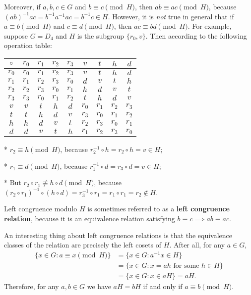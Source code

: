 \documentclass[leqno]{book}
\begin{document}
Moreover, if $a,b,c\in G$ and $b\equiv c\pmod H$, then $ab\equiv ac\pmod H$, because $(ab)^{-1}ac=b^{-1}a^{-1}ac=b^{-1}c\in H$.  However, it is \emph{not} true in general that if $a\equiv b\pmod H$ and $c\equiv d\pmod H$, then $ac\equiv bd\pmod H$.  For example, suppose $G=D_4$ and $H$ is the subgroup $\{r_0,v\}$.  Then according to the following operation table:
\begin{center}
\begin{tabular}{c|cccccccc}
$\circ$ & $r_0$ & $r_1$ & $r_2$ & $r_3$ & $v$ & $t$ & $h$ & $d$\\\hline
$r_0$ & $r_0$ & $r_1$ & $r_2$ & $r_3$ & $v$ & $t$ & $h$ & $d$\\
$r_1$ & $r_1$ & $r_2$ & $r_3$ & $r_0$ & $d$ & $v$ & $t$ & $h$\\
$r_2$ & $r_2$ & $r_3$ & $r_0$ & $r_1$ & $h$ & $d$ & $v$ & $t$\\
$r_3$ & $r_3$ & $r_0$ & $r_1$ & $r_2$ & $t$ & $h$ & $d$ & $v$\\
$v$ & $v$ & $t$ & $h$ & $d$ & $r_0$ & $r_1$ & $r_2$ & $r_3$\\
$t$ & $t$ & $h$ & $d$ & $v$ & $r_3$ & $r_0$ & $r_1$ & $r_2$\\
$h$ & $h$ & $d$ & $v$ & $t$ & $r_2$ & $r_3$ & $r_0$ & $r_1$\\
$d$ & $d$ & $v$ & $t$ & $h$ & $r_1$ & $r_2$ & $r_3$ & $r_0$
\end{tabular}
\end{center}

* $r_2\equiv h\pmod H$, because $r_2^{-1}\circ h=r_2\circ h=v\in H$;

* $r_1\equiv d\pmod H$, because $r_1^{-1}\circ d=r_3\circ d=v\in H$;

* But $r_2\circ r_1\not\equiv h\circ d\pmod H$, because $(r_2\circ r_1)^{-1}\circ(h\circ d)=r_3^{-1}\circ r_1=r_1\circ r_1=r_2\notin H$.

Left congruence modulo $H$ is sometimes referred to as a \textbf{left congruence relation}, because it is an equivalence relation satisfying $b\equiv c\implies ab\equiv ac$.

An interesting thing about left congruence relations is that the equivalence classes of the relation are precisely the left cosets of $H$.  After all, for any $a\in G$,
\begin{align*}
\{x\in G:a\equiv x\pmod H\}&=\{x\in G:a^{-1}x\in H\}\\
&=\{x\in G:x=ah\text{ for some }h\in H\}\\
&=\{x\in G:x\in aH\}=aH.
\end{align*}
Therefore, for any $a,b\in G$ we have $aH=bH$ if and only if $a\equiv b\pmod H$.
\end{document}
